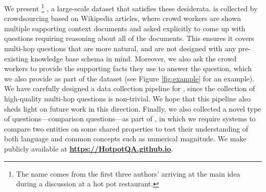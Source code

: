 We present \datasetname%
\footnote{The name comes from the first three authors' arriving at the main idea during a discussion at a hot pot restaurant.}%
, a large-scale dataset that satisfies these desiderata.
\datasetname{} is collected by crowdsourcing based on Wikipedia articles, where crowd workers are shown multiple supporting context documents and asked explicitly to come up with questions requiring reasoning about all of the documents.
This ensures it covers multi-hop questions that are more natural, and are not designed with any pre-existing knowledge base schema in mind.
Moreover, we also ask the crowd workers to provide the supporting facts they use to answer the question, which we also provide as part of the dataset (see Figure \ref{fig:example} for an example).
We have carefully designed a data collection pipeline for \datasetname, since  the collection of high-quality multi-hop questions is non-trivial.
We hope that this pipeline also sheds light on future work in this direction.
Finally, we also collected a novel type of questions---comparison questions---as part of \datasetname, in which we require systems to compare two entities on some shared properties to test their understanding of both language and common concepts such as numerical magnitude. We make \datasetname{} publicly available at \href{https://hotpotqa.github.io}{\bf https://HotpotQA.github.io}.
